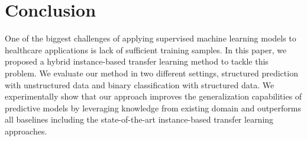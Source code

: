 \documentclass{article}
\begin{document}
\begin{figure}[htbp]
\vspace{-.2cm}
\begin{floatrow}
\end{floatrow}
\vspace{-.35cm}
\end{figure}

\section{Conclusion}
\vspace{-.2cm}
\label{sec:conclusion}
One of the biggest challenges of applying supervised machine learning models to healthcare applications is lack of sufficient training samples. In this paper, we proposed a hybrid instance-based transfer learning method to tackle this problem. We evaluate our method in two different settings, structured prediction with unstructured data and binary classification with structured data. We experimentally show that our approach improves the generalization capabilities of predictive models by leveraging knowledge from existing domain and outperforms all baselines including the state-of-the-art instance-based transfer learning approaches.
\small



\end{document}
